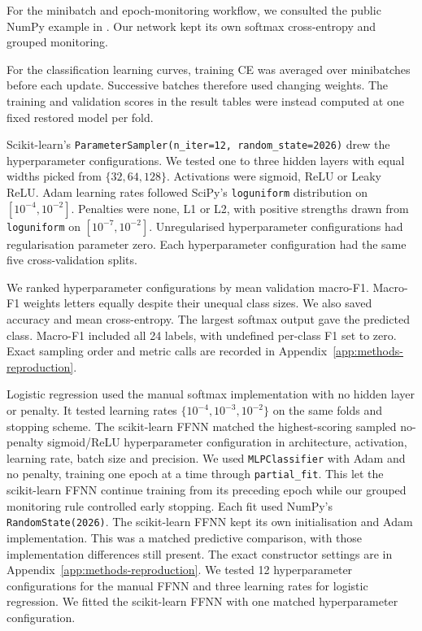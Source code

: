 For the minibatch and epoch-monitoring workflow, we consulted the public
NumPy example in \textcite[Ch.~11]{raschka2022machine}. Our network kept
its own softmax cross-entropy and grouped monitoring.

For the classification learning curves, training CE was averaged over
minibatches before each update. Successive batches therefore used
changing weights. The training and validation scores in the result
tables were instead computed at one fixed restored model per fold.

Scikit-learn's \nolinkurl{ParameterSampler(n_iter=12, random_state=2026)}
drew the hyperparameter configurations. We tested one to three hidden layers with equal
widths picked from $\{32,64,128\}$. Activations were sigmoid, ReLU or
Leaky ReLU. Adam learning rates followed SciPy's \nolinkurl{loguniform} distribution
on $[10^{-4},10^{-2}]$. Penalties were none, L1 or L2, with positive
strengths drawn from \nolinkurl{loguniform} on $[10^{-7},10^{-2}]$.
Unregularised hyperparameter configurations had regularisation parameter zero.
Each hyperparameter configuration had the same five
cross-validation splits.

We ranked hyperparameter configurations by mean validation macro-F1.
Macro-F1 weights letters equally despite their unequal class sizes. We also saved
accuracy and mean cross-entropy. The largest softmax output gave the
predicted class. Macro-F1 included all 24 labels, with undefined per-class
F1 set to zero. Exact sampling order and metric calls are recorded in
Appendix~\ref{app:methods-reproduction}.

Logistic regression used the manual softmax implementation with no hidden
layer or penalty. It tested learning rates $\{10^{-4},10^{-3},10^{-2}\}$ on the same
folds and stopping scheme. The scikit-learn FFNN
\parencite{pedregosa2011sklearn} matched the highest-scoring sampled
no-penalty sigmoid/ReLU hyperparameter configuration in architecture, activation, learning rate,
batch size and precision. We used \nolinkurl{MLPClassifier} with Adam
and no penalty, training one epoch at a time through \nolinkurl{partial_fit}.
This let the scikit-learn FFNN continue training from its preceding epoch
while our grouped monitoring rule controlled early stopping. Each fit used NumPy's \nolinkurl{RandomState(2026)}.
The scikit-learn FFNN kept its own initialisation and Adam implementation.
This was a matched predictive comparison, with those implementation
differences still present. The exact
constructor settings are in Appendix~\ref{app:methods-reproduction}.
We tested 12 hyperparameter configurations for the manual FFNN and three
learning rates for logistic regression. We fitted the scikit-learn FFNN with
one matched hyperparameter configuration.

